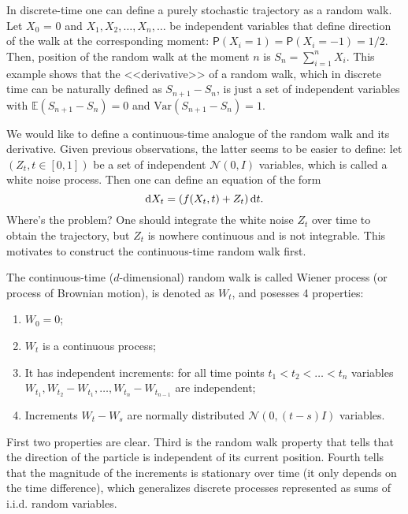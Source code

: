 In discrete-time one can define a purely stochastic trajectory as a random walk. Let $X_0$ = 0 and $X_1, X_2, \ldots, X_n, \ldots$ be independent variables that define direction of the walk at the corresponding moment: $\mathsf{P}(X_i = 1) = \mathsf{P}(X_i = -1) = 1/2$. Then, position of the random walk at the moment $n$ is $S_n = \sum_{i = 1}^{n} X_i$. This example shows that the <<derivative>> of a random walk, which in discrete time can be naturally defined as $S_{n + 1} - S_{n}$, is just a set of independent variables with $\mathbb{E} \left(S_{n + 1} - S_{n}\right) = 0$ and $\text{Var}\left(S_{n + 1} - S_{n}\right) = 1$.

We would like to define a continuous-time analogue of the random walk and its derivative. Given previous observations, the latter seems to be easier to define: let $(Z_t, t \in [0, 1])$ be a set of independent $\mathcal{N}(0, I)$ variables, which is called a white noise process. Then one can define an equation of the form
\[
    \mathrm{d} X_t = \left(f(X_t, t) + Z_t\right)\mathrm{d} t.
\]
Where's the problem? One should integrate the white noise $Z_t$ over time to obtain the trajectory, but $Z_t$ is nowhere continuous and is not integrable. This motivates to construct the continuous-time random walk first.

\begin{definition}
The continuous-time ($d$-dimensional) random walk is called Wiener process (or process of Brownian motion), is denoted as $W_t$, and posesses 4 properties:

\begin{enumerate}
    \item $W_0 = 0$;
    \item $W_t$ is a continuous process;
    \item It has independent increments: for all time points $t_1 < t_2 < \ldots < t_n$ variables $W_{t_1}, W_{t_2} - W_{t_1}, \ldots, W_{t_n} - W_{t_{n - 1}}$ are independent;
    \item Increments $W_t - W_s$ are normally distributed $\mathcal{N}(0, (t - s) I)$ variables.
\end{enumerate}
\end{definition}

First two properties are clear. Third is the random walk property that tells that the direction of the particle is independent of its current position. Fourth tells that the magnitude of the increments is stationary over time (it only depends on the time difference), which generalizes discrete processes represented as sums of i.i.d. random variables.

